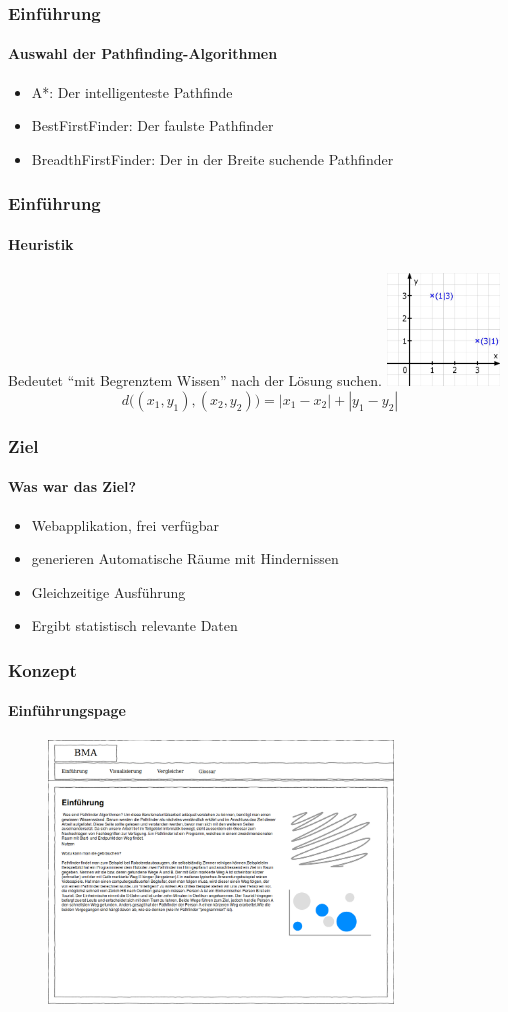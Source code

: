 \documentclass[professionalfont,serif,german]{beamer}
\begin{document}
\begin{frame}
  \frametitle{Einführung}
  \framesubtitle{Auswahl der Pathfinding-Algorithmen}
  \begin{itemize}
    \item \textcolor{pfblue}{A*}: Der intelligenteste Pathfinde 
    \item \textcolor{pfred}{BestFirstFinder}: Der faulste Pathfinder
    \item \textcolor{pfgreen}{BreadthFirstFinder}: Der in der Breite suchende Pathfinder
  \end{itemize}
\end{frame}

\begin{frame}
  \frametitle{Einführung}
  \framesubtitle{Heuristik}
  Bedeutet ``mit Begrenztem Wissen'' nach der Lösung suchen.
  \includegraphics[height=3cm]{img/mathegrafix.jpg}
  \begin{equation*}
    d\big((x_1,y_1),(x_2,y_2)\big) = |x_1 - x_{2}| + |y_{1} - y_{2}|
  \end{equation*}
\end{frame}


\begin{frame}
  \frametitle{Ziel}
  \framesubtitle{Was war das Ziel?}
  \begin{itemize}
    \item Webapplikation, frei verfügbar
    \item generieren Automatische Räume mit Hindernissen %
    \item Gleichzeitige Ausführung
    \item Ergibt statistisch relevante Daten
  \end{itemize}
\end{frame}

\begin{frame}
  \frametitle{Konzept}
  \framesubtitle{Einführungspage}
  \begin{figure}
    \includegraphics[height=7cm]{img/einfuehrung1.png}
  \end{figure}
\end{frame}
\end{document}
